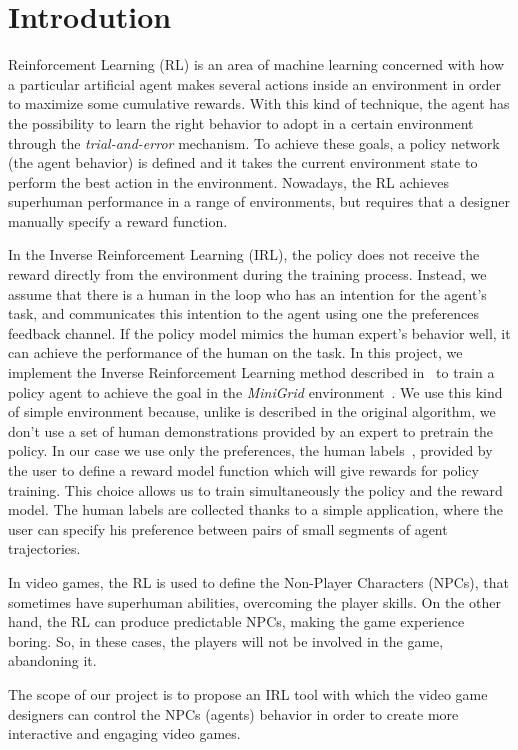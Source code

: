 \section{Introdution}
Reinforcement Learning (RL) is an area of machine learning concerned with how a particular artificial agent makes several actions inside an environment in order to maximize some cumulative rewards. With this kind of technique, the agent has the possibility to learn the right behavior to adopt in a certain environment through the \textsl{trial-and-error} mechanism. 
To achieve these goals, a policy network (the agent behavior) is defined and it takes the current environment state to perform the best action in the environment. Nowadays, the RL achieves superhuman performance in a range of environments, but requires that a designer manually specify a reward function.

In the Inverse Reinforcement Learning (IRL), the policy does not receive the reward directly from the environment during the training process. Instead,  we assume that there is a human in the loop who has an intention for the agent's task, and communicates this intention to the agent using one the preferences feedback channel.  
If the policy model mimics the human expert's behavior well, it can achieve the performance of the human on the task. In this project, we implement the Inverse Reinforcement Learning method described in\ \cite{NIPS2018_8025} to train a policy agent to achieve the goal in the \textsl{MiniGrid} environment\ \cite{gym_minigrid}. We use this kind of simple environment because, unlike is described in the original algorithm, we don't use a set of human demonstrations provided by an expert to pretrain the policy. In our case we use only the preferences, the human labels\ \cite{NIPS2018_8025}, provided by the user to define a reward model function which will give rewards for policy training. This choice allows us to train simultaneously the policy and the reward model. 
The human labels are collected thanks to a simple application, where the user can specify his preference between pairs of small segments of agent trajectories.
 
 In video games, the RL is used to define the Non-Player Characters (NPCs), that sometimes have superhuman abilities, overcoming the player skills. On the other hand, the RL can produce predictable NPCs, making the game experience boring. So, in these cases, the players will not be involved in the game, abandoning it. 
 
 The scope of our project is to propose an IRL tool with which the video game designers can control the NPCs (agents) behavior in order to create more interactive and engaging video games.
 
